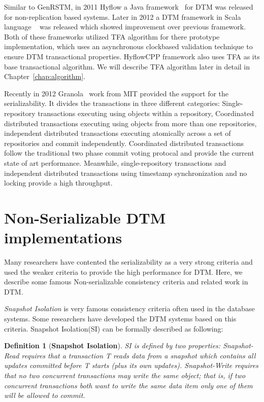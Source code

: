 \documentclass[12pt,english]{report}
\newtheorem{definition}{Definition}[section]
\begin{document}
Similar to GenRSTM, in 2011 Hyflow a Java framework~\cite{Saad:2011:HHP:1996130.1996167} for DTM was released for non-replication based systems. Later in 2012 a DTM framework in Scala language ~\cite{turcuhyflow2}  was released which showed improvement over previous framework. Both of these frameworks utilized TFA algorithm for there prototype implementation, which uses an asynchronous clockbased validation technique to ensure DTM transactional properties. HyflowCPP framework also uses TFA as its base transactional algorithm. We will describe TFA algorithm later in detail in Chapter~\ref{chap:algorithm}.

Recently in 2012 Granola~\cite{cowling2012granola} work from MIT provided the support for the serializability. It divides the transactions in three different categories: Single-repository transactions executing using objects within a repository, Coordinated distributed transactions executing using objects from more than one repositories, independent distributed transactions executing atomically across a set of repositories and commit independently. Coordinated distributed transactions follow the traditional two phase commit voting protocal and provide the current state of art performance. Meanwhile, single-repository transactions and independent distributed transactions using timestamp synchronization and no locking provide a high throughput.   

\section{Non-Serializable DTM implementations}

Many researchers have contented the serializability as a very strong criteria and used the weaker criteria to provide the high performance for DTM. Here, we describe some famous Non-serializable consistency criteria and  related work in DTM. 

\textit{Snapshot Isolation} is very famous consistency criteria often used in the database systems. Some researchers have developed the DTM systems based on this criteria. Snapshot Isolation(SI) can be formally described as following:

\begin{definition}[\textbf{Snapshot Isolation}]
SI is defined by two properties: \textit{Snapshot-Read} requires that a transaction T reads data from a snapshot which contains all updates committed before T starts (plus its own updates). \textit{Snapshot-Write} requires that no two concurrent transactions may write the same object; that is, if two concurrent transactions both want to write the same data item only one of them will be allowed to commit.
\end{definition}
\end{document}
